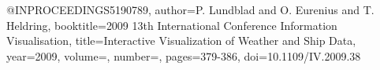 @INPROCEEDINGS{5190789,
  author={P. {Lundblad} and O. {Eurenius} and T. {Heldring}},
  booktitle={2009 13th International Conference Information Visualisation}, 
  title={Interactive Visualization of Weather and Ship Data}, 
  year={2009},
  volume={},
  number={},
  pages={379-386},
  doi={10.1109/IV.2009.38}}
